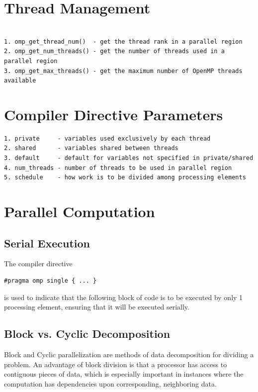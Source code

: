 \documentclass[12pt, letterpaper]{report}
\begin{document}
\section{Thread Management}

\begin{verbatim}

1. omp_get_thread_num()  - get the thread rank in a parallel region
2. omp_get_num_threads() - get the number of threads used in a parallel region
3. omp_get_max_threads() - get the maximum number of OpenMP threads available

\end{verbatim}

\section{Compiler Directive Parameters}

\begin{verbatim}
1. private     - variables used exclusively by each thread
2. shared      - variables shared between threads
3. default     - default for variables not specified in private/shared
4. num_threads - number of threads to be used in parallel region
5. schedule    - how work is to be divided among processing elements
\end{verbatim}

\section{Parallel Computation}

\subsection{Serial Execution}

The compiler directive 
\begin{verbatim}#pragma omp single { ... }\end{verbatim}
is used to indicate that the following block of code is to be executed by only 1 processing element, ensuring that it will be executed serially.

\subsection{Block vs. Cyclic Decomposition}

Block and Cyclic parallelization are methods of data decomposition for dividing a problem. An advantage of block division is that a processor has access to contiguous pieces of data, which is especially important in instances where the computation has dependencies upon corresponding, neighboring data.
\end{document}
